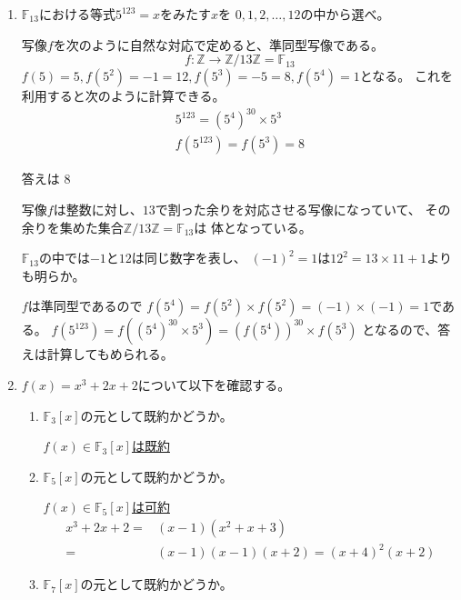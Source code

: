 \documentclass[10pt,b5paper]{ltjsarticle}
\begin{document}
\begin{enumerate}
 \item %
       $\mathbb{F}_{13}$における等式$5^{123}=x$をみたす$x$を
       $0,1,2,\dots,12$の中から選べ。

       \dotfill

       写像$f$を次のように自然な対応で定めると、準同型写像である。
       \begin{equation}
        f: \mathbb{Z} \rightarrow \mathbb{Z}/13\mathbb{Z} = \mathbb{F}_{13}
       \end{equation}
       $f(5)=5, f(5^2)=-1=12, f(5^3)=-5=8, f(5^4)=1$となる。
       これを利用すると次のように計算できる。
       \begin{align}
        5^{123}=(5^4)^{30}\times 5^3\\
        f(5^{123})=f(5^3)=8
       \end{align}

       答えは \underline{ $8$ }

       \dotfill

       写像$f$は整数に対し、$13$で割った余りを対応させる写像になっていて、
       その余りを集めた集合$\mathbb{Z}/13\mathbb{Z}=\mathbb{F}_{13}$は
       体となっている。

       $\mathbb{F}_{13}$の中では$-1$と$12$は同じ数字を表し、
       $(-1)^2=1$は$12^2=13\times 11 +1$よりも明らか。

       $f$は準同型であるので
       $f(5^4)=f(5^2)\times f(5^2)=(-1)\times (-1)=1$である。
       $f(5^{123})=f((5^4)^30\times 5^3)=(f(5^4))^{30}\times f(5^3)$
       となるので、答えは計算してもめられる。
       
       \hrulefill
 \item
      $f(x)=x^3 + 2x +2$について以下を確認する。
      \begin{enumerate}
       \item $\mathbb{F}_{3}[x]$の元として既約かどうか。

             \underline{$f(x) \in \mathbb{F}_{3}[x]$は既約}
       \item $\mathbb{F}_{5}[x]$の元として既約かどうか。

             \underline{$f(x) \in \mathbb{F}_{5}[x]$は可約}
             \begin{align}
              x^3 + 2x +2 =& (x-1)(x^2+x+3)\\
              =& (x-1)(x-1)(x+2) = (x+4)^2(x+2)
             \end{align}

       \item $\mathbb{F}_{7}[x]$の元として既約かどうか。


\end{enumerate}
\end{enumerate}
\end{document}
